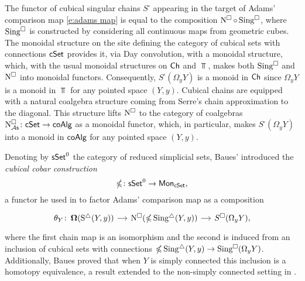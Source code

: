 The functor of cubical singular chains $S^\square$ appearing in the target of Adams' comparison map \eqref{e:adams map} is equal to the composition $\operatorname{N^{\square}} \circ \operatorname{Sing^{\square}}$, where $\operatorname{Sing^{\square}}$ is constructed by considering all continuous maps from geometric cubes.
The monoidal structure on the site defining the category of cubical sets with connections $\mathsf{cSet}$ provides it, via Day convolution, with a monoidal structure, which, with the usual monoidal structures on $\mathsf{Ch}$ and $\Top$, makes both $\operatorname{Sing^{\square}}$ and $\operatorname{N^{\square}}$ into monoidal functors.
Consequently, $S^\square(\Omega_y Y)$ is a monoid in $\mathsf{Ch}$ since $\Omega_y Y$ is a monoid in $\Top$ for any pointed space $(Y, y)$.
Cubical chains are equipped with a natural coalgebra structure coming from Serre's chain approximation to the diagonal.
This structure lifts $\operatorname{N^{\square}}$ to the category of coalgebras $\operatorname{N^{\square}_{\mathcal{A}\mathsf{s}}} \colon \mathsf{cSet} \to \mathsf{coAlg}$ as a monoidal functor, which, in particular, makes $S^\square(\Omega_y Y)$ into a monoid in $\mathsf{coAlg}$ for any pointed space $(Y, y)$.

Denoting by $\mathsf{sSet}^0$ the category of reduced simplicial sets, Baues' introduced the \textit{cubical cobar construction}
\begin{equation*}
\operatorname{\mathbb{\Omega}} \colon \mathsf{sSet}^0 \to \mathsf{Mon}_{\mathsf{cSet}},
\end{equation*}
a functor he used in \cite{baues1998hopf} to factor Adams' comparison map as a composition
\begin{equation} \label{e:baues factorization of adams map}
\begin{tikzcd}[column sep = small]
\theta_Y \colon \cobar(\sS(Y, y)) \arrow[r] &
\cchains(\gcobar \sSing(Y, y)) \arrow[r] &
S^{\square}(\Omega_y Y),
\end{tikzcd}
\end{equation}
where the first chain map is an isomorphism and the second is induced from an inclusion of cubical sets with connections $\operatorname{\mathbb{\Omega}} \operatorname{Sing^{\triangle}}(Y, y) \to \operatorname{Sing^{\square}}(\Omega_y Y)$.
Additionally, Baues proved that when $Y$ is simply connected this inclusion is a homotopy equivalence, a result extended to the non-simply connected setting in \cite{rivera2019path}.


